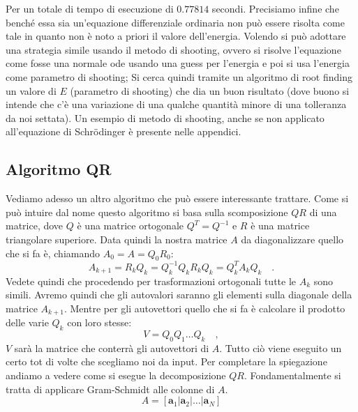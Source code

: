 \documentclass[10pt,a4paper]{article}
\begin{document}
Per un totale di tempo di esecuzione di $0.77814$ secondi. Precisiamo infine che benché essa sia un'equazione differenziale ordinaria non può essere risolta come tale in quanto non è noto a priori il valore dell'energia. Volendo si può adottare una strategia simile usando il metodo di shooting, ovvero si risolve l'equazione come fosse una normale ode usando una guess per l'energia e poi si usa l'energia come parametro di shooting; Si cerca quindi tramite un algoritmo di root finding un valore di $E$ (parametro di shooting) che dia un buon risultato (dove buono si intende che c'è una variazione di una qualche quantità minore di una tolleranza da noi settata). Un esempio di metodo di shooting, anche se non applicato all'equazione di Schrödinger è presente nelle appendici. 

\subsection{Algoritmo QR}
Vediamo adesso un altro algoritmo che può essere interessante trattare. Come si può intuire dal nome questo algoritmo si basa sulla scomposizione $QR$ di una matrice, dove $Q$ è una matrice ortogonale $Q^T = Q^{-1}$ e $R$ è una matrice triangolare superiore. Data quindi la nostra matrice $A$ da diagonalizzare quello che si fa è, chiamando $A_0=A=Q_0 R_0$:
\begin{equation}
A_{k+1} = R_k Q_k = Q^{-1}_k Q_k R_k Q_k = Q^T_k A_k Q_k \quad.
\end{equation}
Vedete quindi che procedendo per trasformazioni ortogonali tutte le $A_k$ sono simili. Avremo quindi che gli autovalori saranno gli elementi sulla diagonale della matrice $A_{k+1}$. Mentre per gli autovettori quello che si fa è calcolare il prodotto delle varie $Q_k$ con loro stesse:
\begin{equation}
V = Q_0 Q_1 \hdots Q_{k} \quad,
\end{equation}
$V$ sarà la matrice che conterrà gli autovettori di $A$. Tutto ciò viene eseguito un certo tot di volte che scegliamo noi da input. Per completare la spiegazione andiamo a vedere come si esegue la decomposizione $QR$.
Fondamentalmente si tratta di applicare Gram-Schmidt alle colonne di $A$.
\begin{equation}
A = [\textbf{a}_1 | \textbf{a}_2 | \hdots | \textbf{a}_N]
\end{equation}
\end{document}
